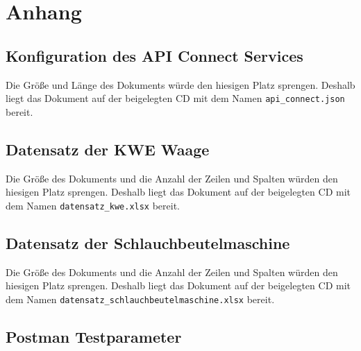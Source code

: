 \chapter{Anhang}
\label{ch:anhang}

\section{Konfiguration des API Connect Services}
\label{sec:konfigurationAPIConnect}
Die Größe und Länge des Dokuments würde den hiesigen Platz sprengen. Deshalb liegt das Dokument auf der beigelegten CD
mit dem Namen \texttt{api\_connect.json} bereit.

\section{Datensatz der KWE Waage}
\label{sec:scaleData}
Die Größe des Dokuments und die Anzahl der Zeilen und Spalten würden den hiesigen Platz sprengen. Deshalb liegt das
Dokument auf der beigelegten CD mit dem Namen \texttt{datensatz\_kwe.xlsx} bereit.

\section{Datensatz der Schlauchbeutelmaschine}
\label{sec:schlauchbeutelmaschine}
Die Größe des Dokuments und die Anzahl der Zeilen und Spalten würden den hiesigen Platz sprengen. Deshalb liegt das
Dokument auf der beigelegten CD mit dem Namen \texttt{datensatz\_schlauchbeutelmaschine.xlsx} bereit.

\newpage

\section{Postman Testparameter}
\label{sec:postmanTestparameter}

